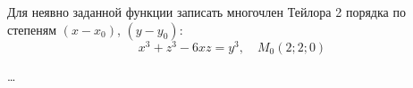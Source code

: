 \begin{problem}
Для неявно заданной функции записать многочлен Тейлора 2 порядка по степеням \( (x-x_0) \), \( (y-y_0) \):
\[ x^3+z^3-6xz=y^3, \quad M_0(2;2;0) \]
\end{problem}

\begin{solution}
  \dots
\end{solution}